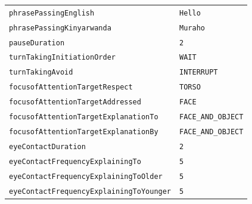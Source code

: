 \documentclass{CSSRforAfrica}
\begin{document}
\begin{table}[H]
\begin{tabular}{l l}
{\footnotesize \verb+phrasePassingEnglish+}                                    & {\footnotesize \verb+Hello+} \vspace{-1.5mm} \\
{\footnotesize \verb+phrasePassingKinyarwanda+}                            & {\footnotesize \verb+Muraho+} \vspace{-1.5mm} \\
{\footnotesize \verb+pauseDuration+} 	                                            & {\footnotesize \verb+2+} \vspace{-1.5mm}   \\
{\footnotesize \verb+turnTakingInitiationOrder+}                             & {\footnotesize \verb+WAIT+} \vspace{-1.5mm} \\
{\footnotesize \verb+turnTakingAvoid+}                                           & {\footnotesize \verb+INTERRUPT+} \vspace{-1.5mm}  \\
{\footnotesize \verb+focusofAttentionTargetRespect+}                     & {\footnotesize \verb+TORSO+ } \vspace{-1.5mm}  \\
{\footnotesize \verb+focusofAttentionTargetAddressed+}                & {\footnotesize \verb+FACE+}  \vspace{-1.5mm} \\
{\footnotesize \verb+focusofAttentionTargetExplanationTo+}          & {\footnotesize \verb+FACE_AND_OBJECT+ }\vspace{-1.5mm} \\
{\footnotesize \verb+focusofAttentionTargetExplanationBy+}  	    & {\footnotesize \verb+FACE_AND_OBJECT+}\vspace{-1.5mm}   \\
{\footnotesize \verb+eyeContactDuration+}                                       & {\footnotesize \verb+2+}  \vspace{-1.5mm} \\
{\footnotesize \verb+eyeContactFrequencyExplainingTo+} 	             & {\footnotesize \verb+5+} \vspace{-1.5mm}  \\
{\footnotesize \verb+eyeContactFrequencyExplainingToOlder+} 	    & {\footnotesize \verb+5+} \vspace{-1.5mm} \\
{\footnotesize \verb+eyeContactFrequencyExplainingToYounger+}   & {\footnotesize \verb+5+} \vspace{-1.5mm} \\

\end{tabular}
\end{table}
\end{document}
